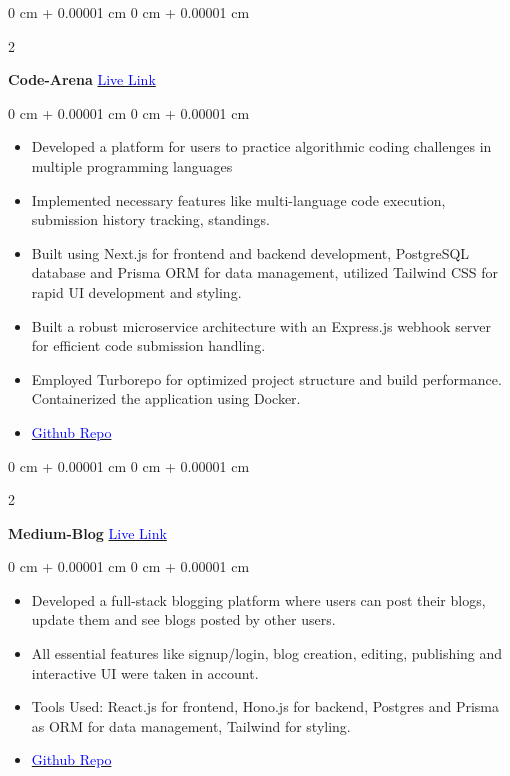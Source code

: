\documentclass[9pt, letterpaper]{article}
\newenvironment{highlights}{
    \begin{itemize}[
        topsep=0.05 cm,
        parsep=0.05 cm,
        partopsep=0pt,
        itemsep=0pt,
        leftmargin=0 cm + 10pt
    ]
}{
    \end{itemize}
}
\newenvironment{onecolentry}{
    \begin{adjustwidth}{
        0 cm + 0.00001 cm
    }{
        0 cm + 0.00001 cm
    }
}{
    \end{adjustwidth}
}
\newenvironment{twocolentry}[2][]{
    \onecolentry
    \def\secondColumn{#2}
    \setcolumnwidth{\fill, 4 cm}
    \begin{paracol}{2}
}{
    \switchcolumn \raggedleft \secondColumn
    \end{paracol}
    \endonecolentry
}
\begin{document}
        
        \begin{twocolentry}{
            \href{https://code-arena-roan.vercel.app/}{\textcolor{blue}{Live Link}}
        }
            \textbf{Code-Arena}\end{twocolentry}

        \vspace{0.05 cm}
        \begin{onecolentry}
            \begin{highlights}
                \item Developed a platform for users to practice algorithmic coding challenges in multiple programming languages
                \item Implemented necessary features like multi-language code execution, submission history tracking, standings.
                \item Built using Next.js for frontend and backend development, PostgreSQL database and Prisma ORM for data management, utilized Tailwind CSS for rapid UI development and styling.
                \item Built a robust microservice architecture with an Express.js webhook server for efficient code submission handling.
                \item Employed Turborepo for optimized project structure and build performance. Containerized the application using Docker.
                \item \href{https://github.com/kartik-chausali/code-arena-turbo}{\textcolor{blue}{Github Repo}}
            \end{highlights}
        \end{onecolentry}

        \vspace{0.1 cm}

        \begin{twocolentry}{
            \href{https://medium-blog-drab.vercel.app/}{\textcolor{blue}{Live Link}}
        }
            \textbf{Medium-Blog}\end{twocolentry}

        \vspace{0.05 cm}
        \begin{onecolentry}
            \begin{highlights}
                \item Developed a full-stack blogging platform where users can post their blogs, update them and see blogs posted by other users.
                \item All essential features like signup/login, blog creation, editing, publishing and interactive UI were taken in account.
                \item Tools Used: React.js for frontend, Hono.js for backend, Postgres and Prisma as ORM for data management, Tailwind for styling.
                \item \href{https://github.com/kartik-chausali/medium-blog}{\textcolor{blue}{Github Repo}}
            \end{highlights}
        \end{onecolentry}
\end{document}

